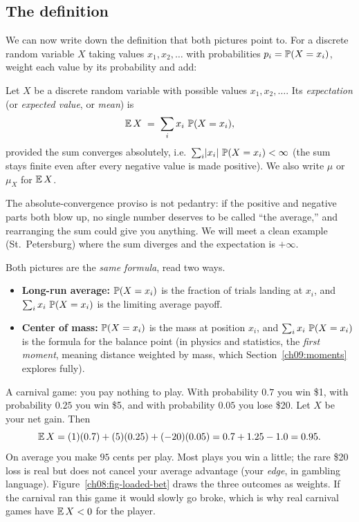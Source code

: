 \subsection{The definition}

We can now write down the definition that both pictures point to. For a discrete
random variable $X$ taking values $x_1, x_2, \dots$ with probabilities
$p_i = \P(X = x_i)$, weight each value by its probability and add:

\begin{definition}
\label{ch08:def-expectation}
Let $X$ be a discrete random variable with possible values $x_1,x_2,\dots$. Its
\emph{expectation} (or \emph{expected value}, or \emph{mean}) is
\[
  \E X \;=\; \sum_i x_i\,\P(X = x_i),
\]
provided the sum converges absolutely, i.e.\ $\sum_i \abs{x_i}\,\P(X=x_i) < \infty$
(the sum stays finite even after every negative value is made positive).
We also write $\mu$ or $\mu_X$ for $\E X$.
\end{definition}

The absolute-convergence proviso is not pedantry: if the positive and negative
parts both blow up, no single number deserves to be called ``the average,'' and
rearranging the sum could give you anything. We will meet a clean example (St.\
Petersburg) where the sum diverges and the expectation is $+\infty$.

\begin{focusbox}
Both pictures are the \emph{same formula}, read two ways.
\begin{itemize}
  \item \textbf{Long-run average:} $\P(X=x_i)$ is the fraction of trials landing
  at $x_i$, and $\sum_i x_i\,\P(X=x_i)$ is the limiting average payoff.
  \item \textbf{Center of mass:} $\P(X=x_i)$ is the mass at position $x_i$, and
  $\sum_i x_i\,\P(X=x_i)$ is the formula for the balance point (in physics and
  statistics, the \emph{first moment}, meaning distance weighted by mass, which
  Section~\ref{ch09:moments} explores fully).
\end{itemize}
\end{focusbox}

\begin{example}
\label{ch08:ex-loaded-bet}
A carnival game: you pay nothing to play. With probability $0.7$ you win \$1,
with probability $0.25$ you win \$5, and with probability $0.05$ you lose \$20.
Let $X$ be your net gain. Then
\[
  \E X = (1)(0.7) + (5)(0.25) + (-20)(0.05)
       = 0.7 + 1.25 - 1.0 = 0.95.
\]
On average you make $95$ cents per play. Most plays you win a little; the rare
\$20 loss is real but does not cancel your average advantage (your
\emph{edge}, in gambling language). Figure~\ref{ch08:fig-loaded-bet} draws the
three outcomes as weights. If the carnival ran this game it would
slowly go broke, which is why real carnival games have $\E X < 0$ for the
player.
\end{example}

